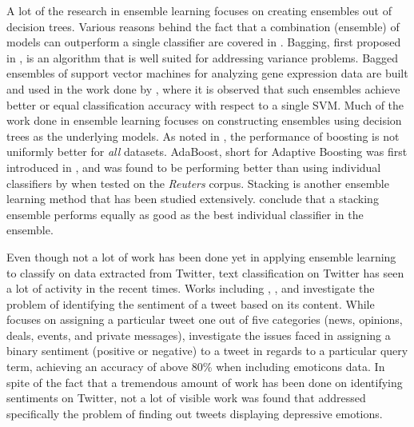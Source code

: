 A lot of the research in ensemble learning focuses on creating ensembles out of decision trees. Various reasons behind the fact that a combination (ensemble) of models can outperform a single classifier are covered in \cite{valentini2002ensembles}. Bagging, first proposed in \cite{breiman1996bagging}, is an algorithm that is well suited for addressing variance problems. Bagged ensembles of support vector machines for analyzing gene expression data are built and used in the work done by \cite{valentini2003bagged}, where it is observed that such ensembles achieve better or equal classification accuracy with respect to a single SVM. Much of the work done in ensemble learning focuses on constructing ensembles using decision trees as the underlying models. As noted in \cite{bauer1999empirical}, the performance of boosting is not uniformly better for \emph{all} datasets. AdaBoost, short for Adaptive Boosting was first introduced in \cite{freund1999short}, and was found to be performing better than using individual classifiers by \cite{bloehdorn2004text} when tested on the \emph{Reuters} \cite{reuters} corpus. Stacking \cite{wolpert1992stacked} is another ensemble learning method that has been studied extensively. \cite{dvzeroski2004combining} conclude that a stacking ensemble performs equally as good as the best individual classifier in the ensemble.

Even though not a lot of work has been done yet in applying ensemble learning to classify on data extracted from Twitter, text classification on Twitter has seen a lot of activity in the recent times. Works including \cite{sriram2010short}, \cite{go2009twitter}, and \cite{jiang2011target} investigate the problem of identifying the sentiment of a tweet based on its content. While \cite{sriram2010short} focuses on assigning a particular tweet one out of five categories (news, opinions, deals, events, and private messages), \cite{go2009twitter} investigate the issues faced in assigning a binary sentiment (positive or negative) to a tweet in regards to a particular query term, achieving an accuracy of above 80\% when including emoticons data. In spite of the fact that a tremendous amount of work has been done on identifying sentiments on Twitter, not a lot of visible work was found that addressed specifically the problem of finding out tweets displaying depressive emotions.
